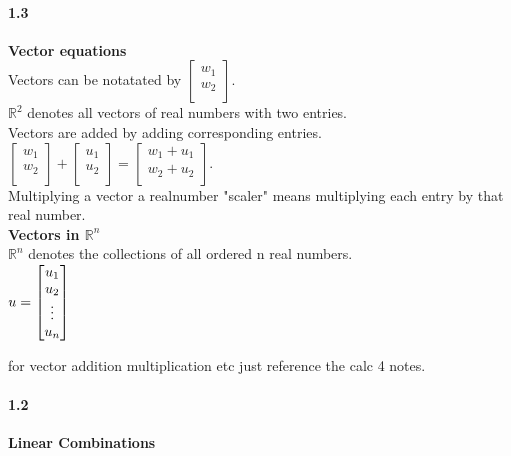 \documentclass[14pt]{extreport}
\begin{document}
\paragraph{1.3}\textbf{Vector equations}\\

Vectors can be notatated by
$\begin{bmatrix}
	w_1 \\
	w_2 \\
  \end{bmatrix}$.\\

$\mathbb{R}^2$ denotes all vectors of real numbers with two entries.\\

Vectors are added by adding corresponding entries.\\
$\begin{bmatrix}
	w_1 \\
	w_2 \\
  \end{bmatrix}
+
\begin{bmatrix}
	u_1 \\
	u_2 \\
  \end{bmatrix}
  =
\begin{bmatrix}
	w_1+u_1 \\
	w_2+u_2 \\
  \end{bmatrix}
  $.\\

Multiplying a vector a realnumber "scaler" means multiplying each entry by that real number.\\


\textbf{Vectors in $\mathbb{R}^n$}\\

$\mathbb{R}^n$ denotes the collections of all ordered n real numbers.\\

$u = 
\begin{bmatrix}
	u_1 \\
	u_2 \\
	\vdots\\
	u_n
\end{bmatrix}\\
$


for vector addition multiplication etc just reference the calc 4 notes.\\

\paragraph{1.2}\textbf{Linear Combinations}\\
\end{document}
